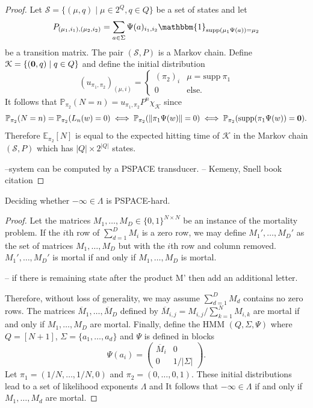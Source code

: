 \documentclass[a4paper,UKenglish,cleveref, autoref,mathscr]{lipics-v2019}
\newcommand{\EE}{\mathbb{E}}
\newcommand{\PP}{\mathbb{P}}
\newcommand{\1}{\mathbbm{1}}
\newcommand{\supp}{\mathrm{supp}}
\begin{document}
\begin{proof}
Let $\mathcal{S} = \{(\mu, q) \mid \mu \in 2^Q, q \in Q\}$ be a set of states and let 
\begin{equation*}
P_{(\mu_1, i_1), (\mu_2, i_2)} = \sum_{a \in \Sigma}\Psi(a)_{i_1, i_2} \1_{\supp(\mu_1 \Psi(a)) = \mu_2}
\end{equation*}
be a transition matrix. The pair $(\mathcal{S}, P)$ is a Markov chain. Define $\mathcal{K} = \{(\bold{0}, q) \mid q \in Q\}$ and define the initial distribution 
\begin{equation*}
(u_{\pi_1, \pi_2})_{(\mu, i)} = \begin{cases}
(\pi_2)_i & \mu = \supp~\pi_1 \\
0 & \text{else}.
\end{cases}
\end{equation*}
It follows that $\PP_{\pi_2}(N = n) = u_{\pi_1, \pi_2} P^n \chi_{\mathcal{K}}$ since 
\begin{equation*}
\PP_{\pi_2}(N = n) = \PP_{\pi_2}(L_n(w) = 0) \iff \PP_{\pi_2}(\|\pi_1 \Psi(w) \| = 0) \iff \PP_{\pi_2}(\supp (\pi_1 \Psi(w)) = \bold{0}).
\end{equation*}
Therefore $\EE_{\pi_2}[N]$ is equal to the expected hitting time of $\mathcal{K}$ in the Markov chain $(\mathcal{S}, P)$ which has $|Q| \times 2^{|Q|}$ states.

--system can be computed by a PSPACE transducer.
-- Kemeny, Snell book citation   
\end{proof}

\begin{lemma}
Deciding whether $-\infty \in \Lambda$ is PSPACE-hard. 
\end{lemma}
\begin{proof}
Let the matrices $M_1, \dots, M_D \in \{0,1\}^{N \times N}$ be an instance of the mortality problem. If the $i$th row of $\sum_{d = 1}^D M_i$ is a zero row, we may define $M_1', \dots, M_D'$ as the set of matrices $M_1, \dots, M_D$ but with the $i$th row and column removed. $M_1', \dots, M_D'$ is mortal if and only if $M_1, \dots, M_D$ is mortal. 

-- if there is remaining state after the product M' then add an additional letter.

Therefore, without loss of generality, we may assume $\sum_{d = 1}^D M_d$ contains no zero rows. The matrices $\overline{M}_1, \dots, \overline{M}_D$ defined by $\overline{M}_{i,j} = M_{i,j} / \sum_{k = 1}^N M_{i,k}$ are mortal if and only if $M_1, \dots, M_D$ are mortal. Finally, define the HMM $(Q, \Sigma, \Psi)$ where $Q = [N + 1]$, $\Sigma = \{a_1, \dots, a_d\}$ and $\Psi$ is defined in blocks
\begin{equation*}
\Psi(a_i) = \begin{pmatrix}
\overline{M}_i & 0 \\
0 & 1/|\Sigma|
\end{pmatrix}.
\end{equation*}
Let $\pi_1 = (1/N, \dots, 1/N, 0)$ and $\pi_2 = (0, \dots, 0, 1)$. These initial distributions lead to a set of likelihood exponents $\Lambda$ and It follows that $-\infty \in \Lambda$ if and only if $M_1, \dots, M_d$ are mortal.
\end{proof}
\end{document}
